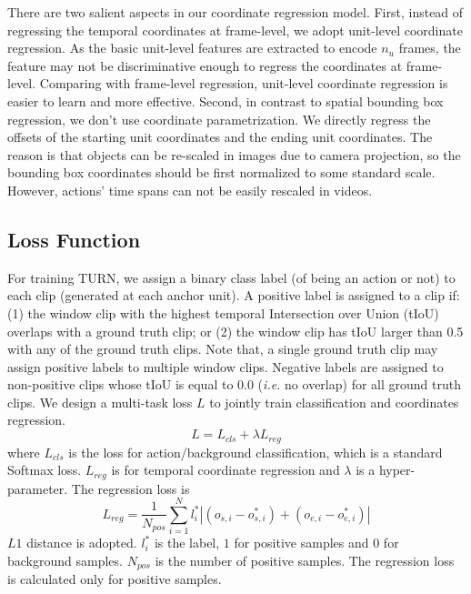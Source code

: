 \documentclass[10pt,twocolumn,letterpaper]{article}
\begin{document}
There are two salient aspects in our coordinate regression model. First, instead of regressing the temporal coordinates at frame-level, we adopt unit-level coordinate regression. As the basic unit-level features are extracted to encode $n_u$ frames, the feature may not be discriminative enough to regress the coordinates at frame-level. Comparing with frame-level regression, unit-level coordinate regression is easier to learn and more effective. Second, in contrast to spatial bounding box regression,  we don't use coordinate parametrization. We directly regress the offsets of the starting unit coordinates and the ending unit coordinates. The reason is that objects can be re-scaled in images due to camera projection, so the bounding box coordinates should be first normalized to some standard scale. However, actions' time spans can not be easily rescaled in videos.



\subsection{Loss Function}
For training TURN, we assign a binary class label (of being an action or not) to each clip (generated at each anchor unit). A positive label is assigned to a clip if: (1) the window clip with the highest temporal Intersection over Union (tIoU) overlaps with a ground truth clip; or (2) the window clip has tIoU larger than 0.5 with any of the ground truth clips. Note that, a single ground truth clip may assign positive labels to multiple window clips. Negative labels are assigned to non-positive clips whose tIoU is equal to 0.0 (\emph{i.e.} no overlap) for all ground truth clips. We design a multi-task loss $L$ to jointly train classification and coordinates regression.
\begin{equation}
L=L_{cls}+\lambda L_{reg}
\end{equation}
where $L_{cls}$ is the loss for action/background classification, which is a standard Softmax loss. $L_{reg}$ is for temporal coordinate regression and $\lambda$ is a hyper-parameter. The regression loss is 
\begin{equation}
L_{reg}=\frac{1}{N_{pos}}\sum_{i=1}^{N}l_i^*|(o_{s,i}-o^*_{s,i}) +(o_{e,i}-o^*_{e,i})|
\end{equation}
$L1$ distance is adopted. $l^*_i$ is the label, $1$ for positive samples and $0$ for background samples. $N_{pos}$ is the number of positive samples. The regression loss is calculated only for positive samples. 
\end{document}
